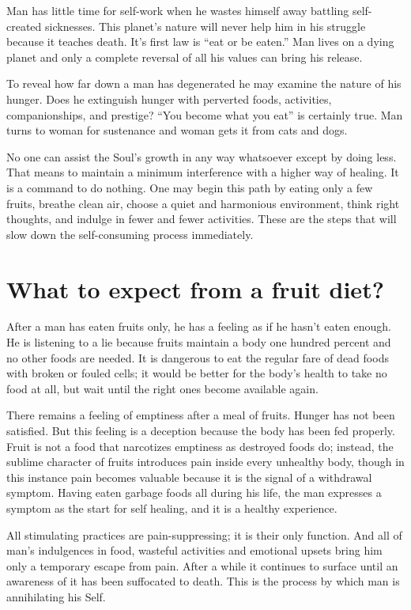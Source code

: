 \documentclass[landscape,twocolumn,letterpaper]{article}
\begin{document}
Man has little time for self-work when he wastes himself away battling
self-created sicknesses. This planet's nature will never help him in
his struggle because it teaches death. It's first law is ``eat or be
eaten.'' Man lives on a dying planet and only a complete reversal of
all his values can bring his release.

To reveal how far down a man has degenerated he may examine the nature
of his hunger. Does he extinguish hunger with perverted foods,
activities, companionships, and prestige? ``You become what you eat''
is certainly true.  Man turns to woman for sustenance and woman gets
it from cats and dogs.

No one can assist the Soul's growth in any way whatsoever except by
doing less. That means to maintain a minimum interference with a
higher way of healing. It is a command to do nothing. One may begin
this path by eating only a few fruits, breathe clean air, choose a
quiet and harmonious environment, think right thoughts, and indulge in
fewer and fewer activities. These are the steps that will slow down
the self-consuming process immediately.


\section{What to expect from a fruit diet?}

After a man has eaten fruits only, he has a feeling as if he hasn't
eaten enough. He is listening to a lie because fruits maintain a body
one hundred percent and no other foods are needed. It is dangerous to
eat the regular fare of dead foods with broken or fouled cells; it
would be better for the body's health to take no food at all, but wait
until the right ones become available again.

There remains a feeling of emptiness after a meal of fruits. Hunger
has not been satisfied. But this feeling is a deception because the
body has been fed properly. Fruit is not a food that narcotizes
emptiness as destroyed foods do; instead, the sublime character of
fruits introduces pain inside every unhealthy body, though in this
instance pain becomes valuable because it is the signal of a
withdrawal symptom. Having eaten garbage foods all during his life,
the man expresses a symptom as the start for self healing, and it is a
healthy experience.

All stimulating practices are pain-suppressing; it is their only
function. And all of man's indulgences in food, wasteful activities
and emotional upsets bring him only a temporary escape from
pain. After a while it continues to surface until an awareness of it
has been suffocated to death. This is the process by which man is
annihilating his Self.
\end{document}
